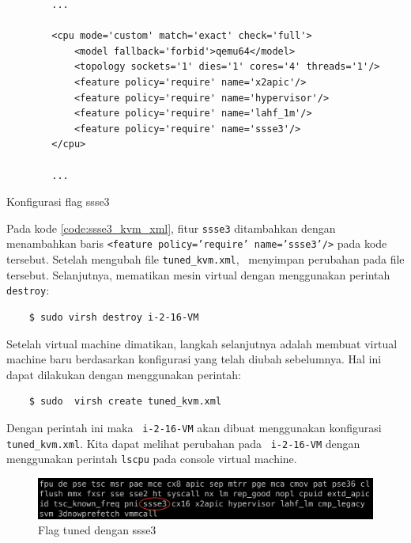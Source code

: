 \begin{listing}[H]
    \begin{verbatim}
        ...

        <cpu mode='custom' match='exact' check='full'>
            <model fallback='forbid'>qemu64</model>
            <topology sockets='1' dies='1' cores='4' threads='1'/>
            <feature policy='require' name='x2apic'/>
            <feature policy='require' name='hypervisor'/> 
            <feature policy='require' name='lahf_1m'/>
            <feature policy='require' name='ssse3'/>
        </cpu>
        
        ...
    \end{verbatim}
    \caption{Konfigurasi flag ssse3}
    \label{code:ssse3_kvm_xml}
\end{listing}

Pada kode \ref{code:ssse3_kvm_xml}, fitur \texttt{ssse3} ditambahkan dengan menambahkan baris \texttt{<feature policy='require' name='ssse3'/>} pada kode tersebut. Setelah mengubah file \texttt{tuned\_kvm.xml}, \saya\ menyimpan perubahan pada file tersebut. Selanjutnya, mematikan mesin virtual dengan menggunakan perintah \texttt{destroy}:

\begin{listing}[H]
    \begin{verbatim}
    $ sudo virsh destroy i-2-16-VM
    \end{verbatim}
\end{listing}

Setelah virtual machine dimatikan, langkah selanjutnya adalah membuat virtual machine baru berdasarkan konfigurasi yang telah diubah sebelumnya. Hal ini dapat dilakukan dengan menggunakan perintah:

\begin{listing}[H]
    \begin{verbatim}
    $ sudo  virsh create tuned_kvm.xml
    \end{verbatim}
\end{listing}

Dengan perintah ini maka \vm\ \texttt{i-2-16-VM} akan dibuat menggunakan konfigurasi \texttt{tuned\_kvm.xml}. Kita dapat melihat perubahan pada \vm\ \texttt{i-2-16-VM} dengan menggunakan perintah \texttt{lscpu} pada console virtual machine.

\begin{figure}
    \centering
    \includegraphics[width=1\textwidth]
    {assets/pics/lscpu_ssse3.jpeg}
    \caption{Flag tuned dengan ssse3}
    \label{fig:lscpu_ssse3}
\end{figure}

